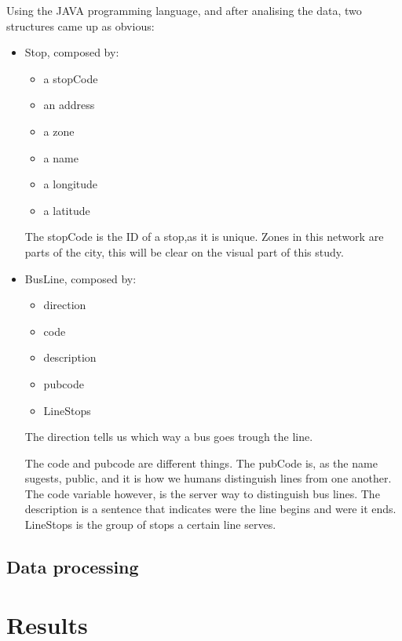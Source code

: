 \documentclass[12pt]{report}
\begin{document}
Using the JAVA programming language, and after analising the data, two structures came up as obvious:
\begin{itemize}
\item Stop, composed by:
	\begin{itemize}
	\item a stopCode
	\item an address
	\item a zone
	\item a name
	\item a longitude
	\item a latitude
	\end{itemize}
	The stopCode is the ID of a stop,as it is unique.
	Zones in this network are parts of the city, this will be clear on the visual part 		of this study.
	
\item BusLine, composed by:
	\begin{itemize}
	\item direction
	\item code
	\item description
	\item pubcode
	\item LineStops
	\end{itemize}
	
	\begin{comment}
	aqui talvez seja preciso dar o exemplo	
	\end{comment}
	The direction tells us which way a bus goes trough the line.
	\begin{comment}
	aqui tb comvem dar exemplo	
	\end{comment}
	The code and pubcode are different things. The pubCode is, as the name sugests, 			public, and it is how we humans distinguish lines from one another. 
	The code variable however, is the server way to distinguish bus lines.
	The description is a sentence that indicates were the line begins and were it ends.
	LineStops is the group of stops a certain line serves.
	
\end{itemize}

\subsection{Data processing}


\section{Results}
\end{document}
